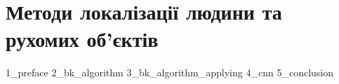 \chapter{Методи локалізації людини та рухомих об'єктів}
{1_preface}
{2_bk_algorithm}
{3_bk_algorithm_applying}
{4_cnn}
{5_conclusion}
